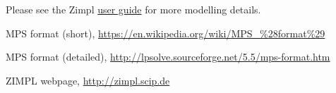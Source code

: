 \documentclass[11pt,listof=totoc]{scrartcl}
\theoremstyle{definition}
\begin{document}
Please see the Zimpl
\href{http://zimpl.zib.de/download/zimpl.pdf}{user guide} for more
modelling details.

\begin{thebibliography}{}
 MPS format (short),
  \url{https://en.wikipedia.org/wiki/MPS_%28format%29}

 MPS format (detailed),
  \url{http://lpsolve.sourceforge.net/5.5/mps-format.htm}

 ZIMPL webpage,
  \url{http://zimpl.scip.de}
\end{thebibliography}
\end{document}

